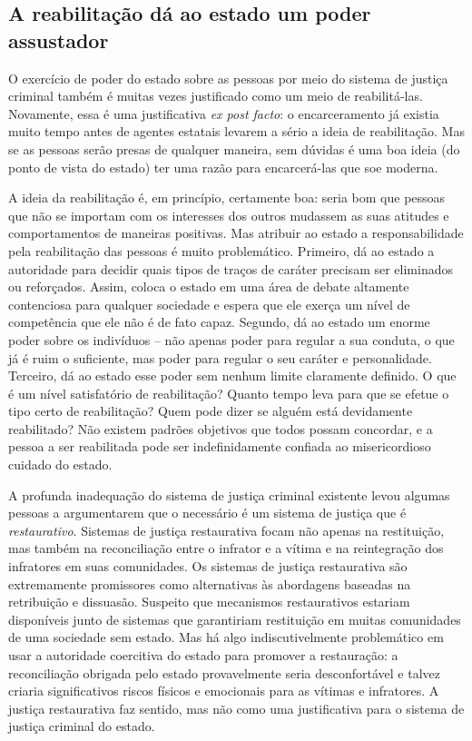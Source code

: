 \subsection*{A reabilitação dá ao estado um poder assustador}

O exercício de poder do estado sobre as pessoas por meio do sistema de justiça criminal também é muitas vezes justificado como um meio de reabilitá-las. Novamente, essa é uma justificativa \emph{ex post facto}: o encarceramento já existia muito tempo antes de agentes estatais levarem a sério a ideia de reabilitação. Mas se as pessoas serão presas de qualquer maneira, sem dúvidas é uma boa ideia (do ponto de vista do estado) ter uma razão para encarcerá-las que soe moderna.

A ideia da reabilitação é, em princípio, certamente boa: seria bom que pessoas que não se importam com os interesses dos outros mudassem as suas atitudes e comportamentos de maneiras positivas. Mas atribuir ao estado a responsabilidade pela reabilitação das pessoas é muito problemático. Primeiro, dá ao estado a autoridade para decidir quais tipos de traços de caráter precisam ser eliminados ou reforçados. Assim, coloca o estado em uma área de debate altamente contenciosa para qualquer sociedade e espera que ele exerça um nível de competência que ele não é de fato capaz. Segundo, dá ao estado um enorme poder sobre os indivíduos -- não apenas poder para regular a sua conduta, o que já é ruim o suficiente, mas poder para regular o seu caráter e personalidade. Terceiro, dá ao estado esse poder sem nenhum limite claramente definido. O que é um nível satisfatório de reabilitação? Quanto tempo leva para que se efetue o tipo certo de reabilitação? Quem pode dizer se alguém está devidamente reabilitado? Não existem padrões objetivos que todos possam concordar, e a pessoa a ser reabilitada pode ser indefinidamente confiada ao misericordioso cuidado do estado.

A profunda inadequação do sistema de justiça criminal existente levou algumas pessoas a argumentarem que o necessário é um sistema de justiça que é \emph{restaurativo}. Sistemas de justiça restaurativa focam não apenas na restituição, mas também na reconciliação entre o infrator e a vítima e na reintegração dos infratores em suas comunidades. Os sistemas de justiça restaurativa são extremamente promissores como alternativas às abordagens baseadas na retribuição e dissuasão. Suspeito que mecanismos restaurativos estariam disponíveis junto de sistemas que garantiriam restituição em muitas comunidades de uma sociedade sem estado. Mas há algo indiscutivelmente problemático em usar a autoridade coercitiva do estado para promover a restauração: a reconciliação obrigada pelo estado provavelmente seria desconfortável e talvez criaria significativos riscos físicos e emocionais para as vítimas e infratores. A justiça restaurativa faz sentido, mas não como uma justificativa para o sistema de justiça criminal do estado.


